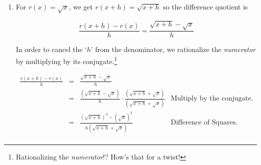 \documentclass{ximera}
\begin{document}
\begin{example}
\begin{explanation}
\begin{enumerate}
 \[ \begin{array}{rclr}  
 g(x+h) & = & \frac{3}{2(x+h)+1} & \\
 & = & \frac{3}{2x+2h+1}, 
 \end{array} \]

which yields 

\begin{longtable}{rclr}  

$\frac{g(x+h)-g(x)}{h}$ & = & $\frac{\frac{3}{2x+2h+1}-\frac{3}{2x+1}}{h}$ & \\ [3pt]
& = &  $\frac{\frac{3}{2x+2h+1}-\frac{3}{2x+1}}{h} \cdot \frac{(2x+2h+1)(2x+1)}{(2x+2h+1)(2x+1)}$ & \\ [3pt]
& = &  $\frac{3(2x+1)-3(2x+2h+1)}{h(2x+2h+1)(2x+1)}$  & \\ [3pt]
& = &  $\frac{6x+3-6x-6h-3}{h(2x+2h+1)(2x+1)}$  & \\ [3pt]
& = &  $\frac{-6h}{h(2x+2h+1)(2x+1)}$  & \\ [3pt]
& = &  $\frac{-6\cancel{h}}{\cancel{h}(2x+2h+1)(2x+1)}$  & \\ [3pt]
& = &  $\frac{-6}{(2x+2h+1)(2x+1)}$.  & \\ 

\end{longtable}

Since we have managed to cancel the original `$h$' from the denominator, we are done.

\item  For $r(x) = \sqrt{x}$, we get $r(x+h) = \sqrt{x+h}$ so the difference quotient is 

\[ \frac{r(x+h) - r(x)}{h} = \frac{\sqrt{x+h} - \sqrt{x}}{h} \]

In order to cancel the `$h$' from the denominator, we rationalize the \textit{numerator} by multiplying by its conjugate.\footnote{Rationalizing the \textit{numerator}!?  How's that for a twist!}

\[ \begin{array}{rcll}  

\frac{r(x+h) - r(x)}{h} & = & \frac{\sqrt{x+h} - \sqrt{x}}{h} & \\  
												
												 & = & \frac{\left(\sqrt{x+h} - \sqrt{x}\right)}{h} \cdot \frac{\left(\sqrt{x+h} + \sqrt{x}\right)}{\left(\sqrt{x+h} + \sqrt{x}\right)} & \text{Multiply by the conjugate.} \\  
										
												 & = &  \frac{\left(\sqrt{x+h}\right)^2 - \left(\sqrt{x}\right)^2}{h\left(\sqrt{x+h} + \sqrt{x}\right)} & \text{Difference of Squares.}\\  
												

\end{array}\]
\end{enumerate}
\end{explanation}
\end{example}
\end{document}
